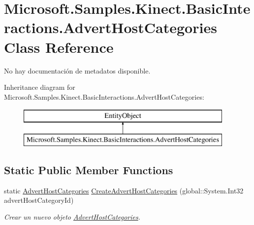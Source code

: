\hypertarget{class_microsoft_1_1_samples_1_1_kinect_1_1_basic_interactions_1_1_advert_host_categories}{\section{Microsoft.\-Samples.\-Kinect.\-Basic\-Interactions.\-Advert\-Host\-Categories Class Reference}
\label{class_microsoft_1_1_samples_1_1_kinect_1_1_basic_interactions_1_1_advert_host_categories}
}


No hay documentación de metadatos disponible.  


Inheritance diagram for Microsoft.\-Samples.\-Kinect.\-Basic\-Interactions.\-Advert\-Host\-Categories\-:\begin{figure}[H]
\begin{center}
\leavevmode
\includegraphics[height=2.000000cm]{class_microsoft_1_1_samples_1_1_kinect_1_1_basic_interactions_1_1_advert_host_categories}
\end{center}
\end{figure}
\subsection*{Static Public Member Functions}
\begin{DoxyCompactItemize}
\item 
static \hyperlink{class_microsoft_1_1_samples_1_1_kinect_1_1_basic_interactions_1_1_advert_host_categories}{Advert\-Host\-Categories} \hyperlink{class_microsoft_1_1_samples_1_1_kinect_1_1_basic_interactions_1_1_advert_host_categories_a8bea11e131ee5702cf886d8885bfddf5}{Create\-Advert\-Host\-Categories} (global\-::\-System.\-Int32 advert\-Host\-Category\-Id)
\begin{DoxyCompactList}\small\item\em Crear un nuevo objeto \hyperlink{class_microsoft_1_1_samples_1_1_kinect_1_1_basic_interactions_1_1_advert_host_categories}{Advert\-Host\-Categories}. \end{DoxyCompactList}\end{DoxyCompactItemize}
